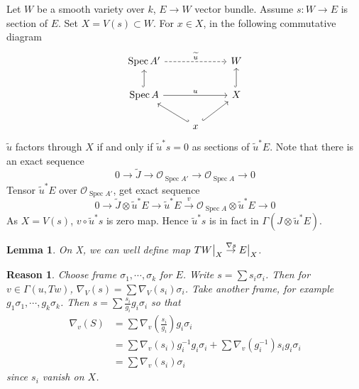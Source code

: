 \documentclass{ctexart}
\newtheorem{lemma}{Lemma}[section]
\newtheorem{reason}{Reason}[section]
\newcommand{\spec}{\operatorname{Spec}}
\begin{document}
Let $W$ be a smooth variety over $k$, $E \rightarrow W$ vector bundle.
Assume $s: W \rightarrow E$ is section of $E$.
Set $X = V(s) \subset W$.
For $x\in X$, in the following commutative diagram
\begin{equation}
    \begin{tikzcd}
        \spec A' \arrow[rr, dashrightarrow,"\widetilde{u}"] &&
        W \\
        \spec A \arrow[u, hookrightarrow] \arrow[rr, "u"] \arrow[dr, hookleftarrow] &&
        X \arrow[u, hookrightarrow] \\
        & x \arrow[ur, hookrightarrow] &
    \end{tikzcd}
\end{equation}
$\widetilde{u}$ factors through $X$ if and only if $\widetilde{u}^{\ast}s = 0$ as sections of $\widetilde{u}^{\ast}E$.
Note that there is an exact sequence
\begin{equation}
    0 \longrightarrow \widetilde{J} \longrightarrow \mathcal{O}_{\spec A'} \longrightarrow \mathcal{O}_{\spec A} \longrightarrow 0
\end{equation}
Tensor $\widetilde{u}^{\ast}E$ over $\mathcal{O}_{\spec A'}$, get exact sequence
\begin{equation}
    0 \longrightarrow \widetilde{J} \otimes \widetilde{u}^{\ast}E \longrightarrow \widetilde{u}^{\ast}E \overset{v}{\longrightarrow} \mathcal{O}_{\spec A} \otimes \widetilde{u}^{\ast}E \longrightarrow 0
\end{equation}
As $X = V(s)$, $v \circ \widetilde{u}^{\ast}s$ is zero map.
Hence $\widetilde{u}^{\ast}s$ is in fact in $\Gamma(J \otimes \widetilde{u}^{\ast}E)$.
\begin{lemma}
    On X, we can well define map $TW\big{|}_{X} \overset{\nabla s}{\rightarrow} E\big{|}_{X}$.
    \label{Lemma 3.2}
\end{lemma}
\begin{reason}
    Choose frame $\sigma_{1}, \cdots, \sigma_{k}$ for $E$.
    Write $s = \sum s_{i}\sigma_{i}$.
    Then for $v\in \Gamma(u, Tw)$, $\nabla_{V}(s) = \sum \nabla_{V}(s_{i})\sigma_{i}$.
    Take another frame, for example $g_{1}\sigma_{1}, \cdots, g_{k}\sigma_{k}$.
    Then $s = \sum \frac{s_{i}}{g_{i}}g_{i}\sigma_{i}$ so that
    \begin{equation}
        \begin{split}
            \nabla_{v}(S) & = \sum \nabla_{v}(\frac{s_{i}}{g_{i}})g_{i}\sigma_{i} \\
            & = \sum \nabla_{v}(s_{i})g_{i}^{-1}g_{i}\sigma_{i} + \sum \nabla_{v}(g_{i}^{-1})s_{i}g_{i}\sigma_{i} \\
            & = \sum \nabla_{v}(s_{i})\sigma_{i}
        \end{split}
    \end{equation}
    since $s_{i}$ vanish on $X$.
\end{reason}
\end{document}
